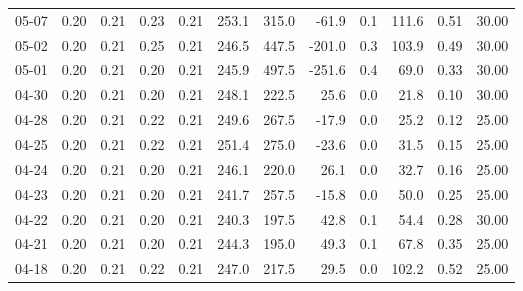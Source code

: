 \begin{threeparttable}
{\begin{tabular}{lrrrrrrrrrrr}
  05-07 &          0.20 &          0.21 &          0.23 &        0.21 &               253.1 &               315.0 &      -61.9 &                 0.1 &            111.6 &            0.51 &                  30.00 \\
  05-02 &          0.20 &          0.21 &          0.25 &        0.21 &               246.5 &               447.5 &     -201.0 &                 0.3 &            103.9 &            0.49 &                  30.00 \\
  05-01 &          0.20 &          0.21 &          0.20 &        0.21 &               245.9 &               497.5 &     -251.6 &                 0.4 &             69.0 &            0.33 &                  30.00 \\
  04-30 &          0.20 &          0.21 &          0.20 &        0.21 &               248.1 &               222.5 &       25.6 &                 0.0 &             21.8 &            0.10 &                  30.00 \\
  04-28 &          0.20 &          0.21 &          0.22 &        0.21 &               249.6 &               267.5 &      -17.9 &                 0.0 &             25.2 &            0.12 &                  25.00 \\
  04-25 &          0.20 &          0.21 &          0.22 &        0.21 &               251.4 &               275.0 &      -23.6 &                 0.0 &             31.5 &            0.15 &                  25.00 \\
  04-24 &          0.20 &          0.21 &          0.20 &        0.21 &               246.1 &               220.0 &       26.1 &                 0.0 &             32.7 &            0.16 &                  25.00 \\
  04-23 &          0.20 &          0.21 &          0.20 &        0.21 &               241.7 &               257.5 &      -15.8 &                 0.0 &             50.0 &            0.25 &                  25.00 \\
  04-22 &          0.20 &          0.21 &          0.20 &        0.21 &               240.3 &               197.5 &       42.8 &                 0.1 &             54.4 &            0.28 &                  30.00 \\
  04-21 &          0.20 &          0.21 &          0.20 &        0.21 &               244.3 &               195.0 &       49.3 &                 0.1 &             67.8 &            0.35 &                  25.00 \\
  04-18 &          0.20 &          0.21 &          0.22 &        0.21 &               247.0 &               217.5 &       29.5 &                 0.0 &            102.2 &            0.52 &                  25.00 \\

\end{tabular}}
\end{threeparttable}
